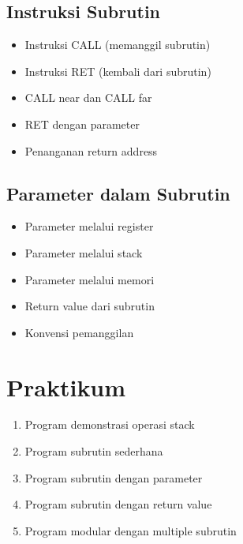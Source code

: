 \subsection{Instruksi Subrutin}
\begin{itemize}
\item Instruksi CALL (memanggil subrutin)
\item Instruksi RET (kembali dari subrutin)
\item CALL near dan CALL far
\item RET dengan parameter
\item Penanganan return address
\end{itemize}

\subsection{Parameter dalam Subrutin}
\begin{itemize}
\item Parameter melalui register
\item Parameter melalui stack
\item Parameter melalui memori
\item Return value dari subrutin
\item Konvensi pemanggilan
\end{itemize}

\section{Praktikum}
\begin{enumerate}
\item Program demonstrasi operasi stack
\item Program subrutin sederhana
\item Program subrutin dengan parameter
\item Program subrutin dengan return value
\item Program modular dengan multiple subrutin
\end{enumerate}

